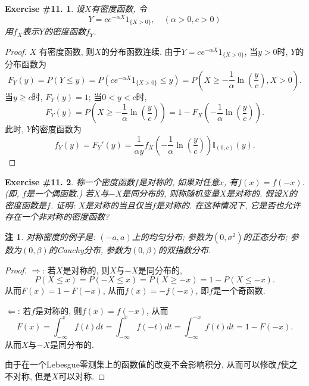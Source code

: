 \documentclass[UTF8, a4paper]{article}
\newtheorem{exercise}{Exercise \#11.}
\newtheorem*{remark}{注}
\begin{document}
\begin{framed}
\begin{exercise}
设\(X\)有密度函数, 令
$$
Y=c e^{-\alpha X} 1_{\{X>0\}}, \quad(\alpha>0, c>0)
$$
用\(f_X\)表示\(Y\)的密度函数\(f_Y\).
\end{exercise}
\end{framed}

\begin{proof}
\(X\) 有密度函数, 则\(X\)的分布函数连续.
由于\(Y = c e^{-\alpha X} 1_{\{X>0\}}\), 当\(y > 0\)时, \(Y\)的分布函数为
$$
F_Y(y) = P(Y \leq y) = P\left(c e^{-\alpha X} 1_{\{X>0\}} \leq y\right) = P\left(X \geq -\frac{1}{\alpha}\ln\left(\frac{y}{c}\right), X > 0\right) .
$$
当\(y \geq c\)时, \(F_Y(y) = 1\); 当\(0 < y < c\)时, 
$$F_Y(y) = P\left(X \geq -\frac{1}{\alpha}\ln\left(\frac{y}{c}\right)\right) = 1 - F_X\left(-\frac{1}{\alpha}\ln\left(\frac{y}{c}\right)\right). $$
此时, \(Y\)的密度函数为
$$
f_Y(y) = F_Y'(y) = \frac{1}{\alpha y} f_X\left(-\frac{1}{\alpha}\ln\left(\frac{y}{c}\right)\right) \mathbb{I}_{(0, c)}(y).
$$
\end{proof}


\begin{framed}
\begin{exercise}
称一个密度函数\(f\)是{\it 对称的}, 如果对任意\(x\), 有\(f(x) = f(-x)\). (即, \(f\)是一个偶函数.)
若\(X\)与\(-X\)是同分布的, 则称随机变量\(X\)是{\it 对称的}.
假设\(X\)的密度函数是\(f\). 证明: \(X\)是对称的当且仅当\(f\)是对称的. 
在这种情况下, 它是否也允许存在一个非对称的密度函数?
\end{exercise}
\end{framed}
\begin{remark}
对称密度的例子是: \((-a,a)\)上的均匀分布; 参数为\((0, \sigma^2)\)的正态分布; 参数为\((0, \beta)\)的Cauchy分布, 参数为\((0, \beta)\)的双指数分布.
\end{remark}

\begin{proof}
\(\Rightarrow\): 若\(X\)是对称的, 则\(X\)与\(-X\)是同分布的,
$$
P(X \leq x) = P(-X \leq x) = P(X \geq -x) = 1 - P(X \leq -x).
$$
从而\(F(x) = 1 - F(-x)\), 从而\(f(x) = -f(-x)\), 即\(f\)是一个奇函数.

\(\Leftarrow\): 若\(f\)是对称的, 则\(f(x) = f(-x)\), 从而
$$
F(x) = \int_{-\infty}^x f(t)dt = \int_{-\infty}^x f(-t)dt = \int_{-\infty}^{-x} f(t)dt = 1 - F(-x).
$$
从而\(X\)与\(-X\)是同分布的.

由于在一个Lebesgue零测集上的函数值的改变不会影响积分, 从而可以修改\(f\)使之不对称, 但是\(X\)可以对称.
\end{proof}
\end{document}
